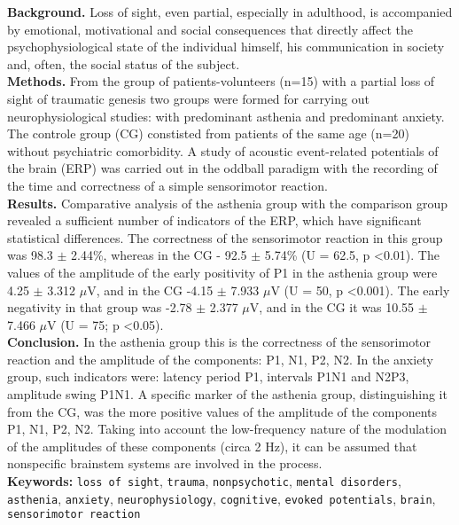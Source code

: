 \documentclass[twocolumn]{article}
\begin{document}
\textbf{Background. }Loss of sight, even partial, especially in adulthood, is accompanied by emotional, motivational and social consequences that directly affect the psychophysiological state of the individual himself, his communication in society and, often, the social status of the subject.  \vspace{1ex}\\
\textbf{Methods. }From the group of patients-volunteers (n=15) with a partial loss of sight of traumatic genesis two groups were formed for carrying out neurophysiological studies: with predominant asthenia and predominant anxiety. The controle group (CG) constisted from patients of the same age (n=20) without psychiatric comorbidity. A study of acoustic event-related potentials of the brain (ERP) was carried out in the oddball paradigm with the recording of the time and correctness of a simple sensorimotor reaction. \vspace{1ex}\\
\textbf{Results. }Comparative analysis of the asthenia group with the comparison group revealed a sufficient number of indicators of the ERP, which have significant statistical differences. The correctness of the sensorimotor reaction in this group was 98.3 $\pm$ 2.44\%, whereas in the CG - 92.5 $\pm$ 5.74\% (U = 62.5, p \textless{}0.01). The values of the amplitude of the early positivity of P1 in the asthenia group were 4.25 $\pm$ 3.312 $\mu$V, and in the CG -4.15 $\pm$ 7.933 $\mu$V (U = 50, p \textless{}0.001). The early negativity in that group was -2.78 $\pm$ 2.377 $\mu$V, and in the CG it was 10.55 $\pm$ 7.466 $\mu$V (U = 75; p \textless{}0.05). \vspace{1ex}\\
\textbf{Conclusion. }In the asthenia group this is the correctness of the sensorimotor reaction and the amplitude of the components: P1, N1, P2, N2. In the anxiety group, such indicators were: latency period P1, intervals P1N1 and N2P3, amplitude swing P1N1. A specific marker of the asthenia group, distinguishing it from the CG, was the more positive values of the amplitude of the components P1, N1, P2, N2. Taking into account the low-frequency nature of the modulation of the amplitudes of these components (circa 2 Hz), it can be assumed that nonspecific brainstem systems are involved in the process. \vspace{1ex}\\
\textbf{Keywords:} \texttt{loss of sight}, 
\texttt{trauma}, 
\texttt{nonpsychotic}, 
\texttt{mental disorders}, 
\texttt{asthenia}, 
\texttt{anxiety}, 
\texttt{neurophysiology}, 
\texttt{cognitive}, 
\texttt{evoked potentials}, 
\texttt{brain}, 
\texttt{sensorimotor reaction}
\end{document}

